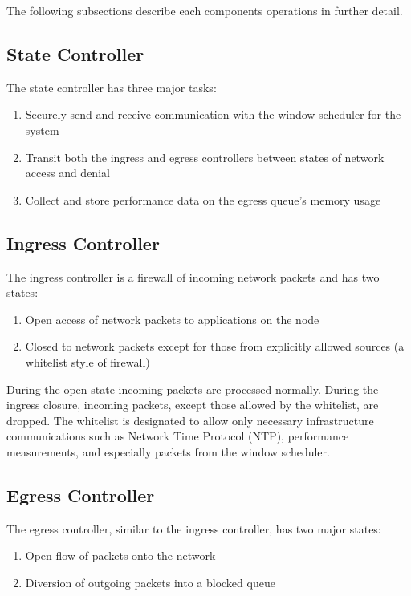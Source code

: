 \documentclass[oneside,12pt]{memoir}
\begin{document}
The following subsections describe each components operations in further detail. 
\subsection{State Controller}
The state controller has three major tasks:
\begin{enumerate} \itemsep1pt \parskip0pt 
\item Securely send and receive communication with the window scheduler for the system
\item Transit both the ingress and egress controllers between states of network access and denial
\item Collect and store performance data on the egress queue's memory usage
\end{enumerate}

 

\subsection{Ingress Controller}
The ingress controller is a firewall of incoming network packets and has two states:
\begin{enumerate} \itemsep1pt \parskip0pt 
\item Open access of network packets to applications on the node
\item Closed to network packets except for those from explicitly allowed sources (a whitelist style of firewall)
\end{enumerate}


During the open state incoming packets are processed normally. During the ingress closure, incoming packets, except those allowed by the whitelist, are dropped. The whitelist is designated to allow only necessary infrastructure communications such as Network Time Protocol (NTP), performance measurements, and especially packets from the window scheduler.
\subsection{Egress Controller}
The egress controller, similar to the ingress controller, has two major states:
\begin{enumerate} \itemsep1pt \parskip0pt 
\item Open flow of packets onto the network
\item Diversion of outgoing packets into a blocked queue
\end{enumerate}
\end{document}
